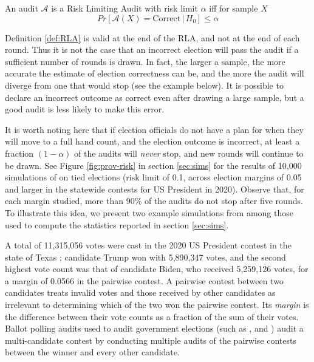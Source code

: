 \begin{definition}
\label{def:RLA}
An audit $\mathcal{A}$ is a Risk Limiting Audit with 
risk limit $\alpha$ iff for sample $X$
$$
Pr[\mathcal{A}(X) 
= \text{Correct} \,|\, H_0]\le \alpha
$$
\end{definition}

Definition \ref{def:RLA} is valid at the end of the RLA, and not at the end of each round. Thus it is not the case that an incorrect election will pass the audit if a sufficient number of rounds is drawn. In fact, the larger a sample, the more accurate the estimate of election correctness can be, and the more the audit will diverge from one that would stop (see the example below). It is possible to declare an incorrect outcome as correct even after drawing a large sample, but a good audit is less likely to make this error. 


 It is worth noting here that if election officials do not have a plan for when they will move to a full hand count, and the election outcome is incorrect, at least a fraction $(1-\alpha)$ of the audits will {\em never} stop, and new rounds will continue to be drawn. See Figure \ref{fig:prov-risk} in section \ref{sec:sims} for the results of 10,000 simulations of \Providence on tied elections (risk limit of 0.1, across election margins of 0.05 and larger in the statewide contests for US President in 2020). Observe that, for each margin studied, more than 90\% of the audits do not stop after five rounds. To illustrate this idea, we present two example simulations from among those used to compute the statistics reported in section \ref{sec:sims}. 

A total of 11,315,056 votes were cast in the 2020 US President contest in the state of Texas \cite{MIT-Data-Lab}; candidate Trump won with 5,890,347 votes, and the second highest vote count was that of candidate Biden, who received 5,259,126 votes, for a margin of 0.0566 in the pairwise contest. A pairwise contest between two candidates treats invalid votes and those received by other candidates as irrelevant to determining which of the two won the pairwise contest. Its {\em margin} is the difference between their vote counts as a fraction of the sum of their votes. Ballot polling audits used to audit government elections (such as \BRAVO, \Minerva and \Providence) audit a multi-candidate contest by conducting multiple audits of the pairwise contests between the winner and every other candidate. 

